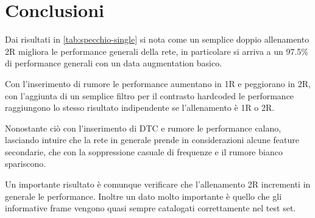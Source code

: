 \chapter{Conclusioni}\label{conclusioni}

Dai risultati in \cref{tab:specchio-single} si  nota come un semplice doppio allenamento 2R migliora le performance generali della rete, in particolare si arriva a un 97.5\% di performance generali con un data augmentation basico. 

Con l'inserimento di rumore le performance aumentano in 1R e peggiorano in 2R, con l'aggiunta di un semplice filtro per il contrasto hardcoded le performance raggiungono lo stesso risultato indipendente se l'allenamento è 1R o 2R.

Nonostante ciò con l'inserimento di DTC e rumore le performance calano, lasciando intuire che la rete in generale prende in considerazioni alcune feature secondarie, che con la soppressione casuale di frequenze e il rumore bianco spariscono.

Un importante risultato è comunque verificare che l'allenamento 2R incrementi in generale le performance. Inoltre un dato molto importante è  quello che gli informative frame vengono quasi sempre catalogati correttamente nel test set.